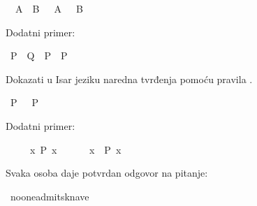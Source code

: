\begin{isabellebody}
\begin{exercise}[subtitle=Pravilo ccontr i classical.]
\ {\isachardoublequoteopen}{\isasymnot}\ {\isacharparenleft}{\kern0pt}A\ {\isasymand}\ B{\isacharparenright}{\kern0pt}\ {\isasymlongrightarrow}\ {\isasymnot}\ A\ {\isasymor}\ {\isasymnot}\ B{\isachardoublequoteclose}%
\isadelimproof
%
\endisadelimproof
%
\isatagproof
%
\endisatagproof
{\isafoldproof}%
%
\isadelimproof
%
\endisadelimproof
%
\begin{isamarkuptext}%
Dodatni primer:%
\end{isamarkuptext}\isamarkuptrue%
\isamarkupfalse%
\ {\isachardoublequoteopen}{\isacharparenleft}{\kern0pt}{\isacharparenleft}{\kern0pt}P\ {\isasymlongrightarrow}\ Q{\isacharparenright}{\kern0pt}\ {\isasymlongrightarrow}\ P{\isacharparenright}{\kern0pt}\ {\isasymlongrightarrow}\ P{\isachardoublequoteclose}%
\isadelimproof
%
\endisadelimproof
%
\isatagproof
%
\endisatagproof
{\isafoldproof}%
%
\isadelimproof
%
\endisadelimproof
%
\begin{isamarkuptext}%
Dokazati u Isar jeziku naredna tvrđenja pomoću pravila .%
\end{isamarkuptext}\isamarkuptrue%
\isamarkupfalse%
\ {\isachardoublequoteopen}P\ {\isasymor}\ {\isasymnot}\ P{\isachardoublequoteclose}%
\isadelimproof
%
\endisadelimproof
%
\isatagproof
%
\endisatagproof
{\isafoldproof}%
%
\isadelimproof
%
\endisadelimproof
%
\begin{isamarkuptext}%
Dodatni primer:%
\end{isamarkuptext}\isamarkuptrue%
\isamarkupfalse%
\isanewline
\ \ \ {\isachardoublequoteopen}{\isasymnot}\ {\isacharparenleft}{\kern0pt}{\isasymforall}\ x{\isachardot}{\kern0pt}\ P\ x{\isacharparenright}{\kern0pt}{\isachardoublequoteclose}\isanewline
\ \ \ \ \ {\isachardoublequoteopen}{\isasymexists}\ x{\isachardot}{\kern0pt}\ {\isasymnot}\ P\ x{\isachardoublequoteclose}%
\isadelimproof
%
\endisadelimproof
%
\isatagproof
%
\endisatagproof
{\isafoldproof}%
%
\isadelimproof
%
\endisadelimproof
%
\end{exercise}
%
\begin{exercise}[subtitle=Logčki lavirinti.]
%
\begin{isamarkuptext}%
Svaka osoba daje potvrdan odgovor na pitanje: %
\end{isamarkuptext}\isamarkuptrue%
\isamarkupfalse%
\ no{\isacharunderscore}{\kern0pt}one{\isacharunderscore}{\kern0pt}admits{\isacharunderscore}{\kern0pt}knave{\isacharcolon}{\kern0pt}\isanewline

\end{exercise}
\end{isabellebody}
